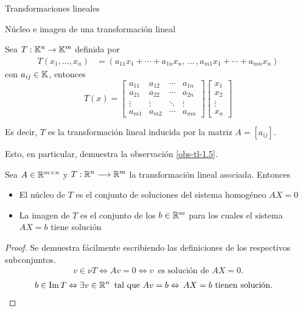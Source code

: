 \begin{chapter}{Transformaciones lineales}
\begin{section}{N\'ucleo e imagen de una transformaci\'on lineal}
\begin{observacion}\label{obs-nu-im} 	Sea $T: \mathbb K^n \to \mathbb K^m$ definida por
    \begin{align*}
    T(x_1,\ldots,x_n) &= (a_{11}x_1+\cdots + a_{1n}x_n,\, \ldots\,,a_{m1}x_1+\cdots + a_{mn}x_n )
    \end{align*}
    con $a_{ij} \in \mathbb K$, entonces 
    \begin{equation*}
        T(x) = \begin{bmatrix*}
            a_{11}& a_{12} & \cdots &a_{1n} \\
            a_{21}& a_{22} & \cdots &a_{2n} \\
            \vdots&\vdots&\ddots&\vdots \\
            a_{m1}& a_{m2} & \cdots &a_{mn}
        \end{bmatrix*}
        \begin{bmatrix}
            x_1 \\ x_2 \\ \vdots \\ x_n
        \end{bmatrix}
    \end{equation*} 

    Es decir,  $T$ es la transformación lineal inducida por la matriz $A = [a_{ij}]$. 
 
    Esto, en particular,  demuestra la observación  \ref{obs-tl-1.5}.
\end{observacion}



\begin{proposicion}

    Sea $A\in\mathbb R^{m\times n}$ y $T:\mathbb R^n\longrightarrow\mathbb R^m$ la transformación lineal asociada. Entonces
    \begin{itemize}
     \item El núcleo de $T$ es el conjunto de soluciones del sistema homogéneo $AX=0$
     
     \item La imagen de $T$ es el conjunto de los $b\in\mathbb R^m$ para los cuales el sistema $AX=b$ tiene solución
    \end{itemize}
    \end{proposicion}
    \begin{proof}
        
   
    Se demuestra fácilmente escribiendo las definiciones de los respectivos subconjuntos.
    \begin{align*}
    v\in\nu T\Leftrightarrow Av=0\Leftrightarrow v\,\mbox{ es solución de $AX=0$.}
    \end{align*}
    \begin{align*}
    b\in\operatorname{Im} T&\Leftrightarrow\exists v\in\mathbb R^n\,\mbox{ tal que } Av=b 
    \Leftrightarrow\,\mbox{$AX=b$ tienen solución}.
    \end{align*}
\end{proof}
    

\end{section}
\end{chapter}
